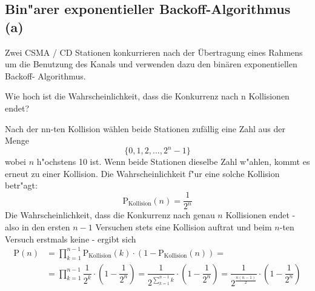 \setcounter{section}{3}
\setcounter{subsection}{7} %
\subsection{Bin"arer exponentieller Backoff-Algorithmus (a)}

Zwei CSMA / CD Stationen konkurrieren nach der Übertragung eines Rahmens um die
Benutzung des Kanals und verwenden dazu den binären exponentiellen Backoff-
Algorithmus.

Wie hoch ist die Wahrscheinlichkeit, dass die Konkurrenz nach n Kollisionen
endet?

Nach der nn-ten Kollision wählen beide Stationen zufällig eine Zahl aus der Menge
\begin{equation*}
    \{0, 1, 2, ..., 2^n - 1\}
\end{equation*}
wobei $n$ h"ochstens 10 ist. Wenn beide Stationen dieselbe Zahl w"ahlen, kommt
es erneut zu einer Kollision. Die Wahrscheinlichkeit f"ur eine solche Kollision betr"agt:
\begin{equation*}
    \text{P}_\text{Kollision}(n) = \dfrac{1}{2^n}
\end{equation*}
Die Wahrscheinlichkeit, dass die Konkurrenz nach genau $n$ Kollisionen endet -
also in den ersten $n - 1$ Versuchen stets eine Kollision auftrat und beim
$n$-ten Versuch erstmals keine - ergibt sich
\begin{align*}
    \text{P}(n) &= \prod_{k = 1}^{n - 1} \text{P}_\text{Kollision}(k) \cdot (1 - \text{P}_\text{Kollision}(n)) = \\[5pt]
                &= \prod_{k = 1}^{n - 1} \dfrac{1}{2^k} \cdot \left(1 - \dfrac{1}{2^n}\right) = \dfrac{1}{2^{\sum_{k = 1}^{n - 1}k}} \cdot \left(1 - \dfrac{1}{2^n}\right) = \dfrac{1}{2^{\frac{n(n - 1)}{2}}} \cdot \left(1 - \dfrac{1}{2^n}\right)
\end{align*}
